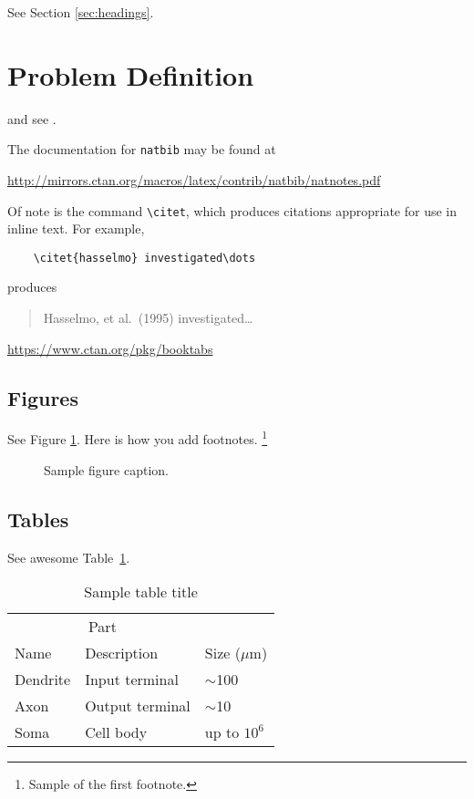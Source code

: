 \documentclass{article}
\begin{document}
	See Section \ref{sec:headings}.
	
	
	\section{Problem Definition}
	\label{sec:others}
	\lipsum[8] \cite{kour2014real,kour2014fast} and see \cite{hadash2018estimate}.
	
	The documentation for \verb+natbib+ may be found at
	\begin{center}
		\url{http://mirrors.ctan.org/macros/latex/contrib/natbib/natnotes.pdf}
	\end{center}
	Of note is the command \verb+\citet+, which produces citations
	appropriate for use in inline text.  For example,
	\begin{verbatim}
	\citet{hasselmo} investigated\dots
	\end{verbatim}
	produces
	\begin{quote}
		Hasselmo, et al.\ (1995) investigated\dots
	\end{quote}
	
	\begin{center}
		\url{https://www.ctan.org/pkg/booktabs}
	\end{center}
	
	
	\subsection{Figures}
	\lipsum[10] 
	See Figure \ref{fig:fig1}. Here is how you add footnotes. \footnote{Sample of the first footnote.}
	\lipsum[11] 
	
	\begin{figure}
		\centering
		\fbox{\rule[-.5cm]{4cm}{4cm} \rule[-.5cm]{4cm}{0cm}}
		\caption{Sample figure caption.}
		\label{fig:fig1}
	\end{figure}
	
	\subsection{Tables}
	\lipsum[12]
	See awesome Table~\ref{tab:table}.
	
	\begin{table}
		\caption{Sample table title}
		\centering
		\begin{tabular}{lll}
			\toprule
			\multicolumn{2}{c}{Part}                   \\
			\cmidrule(r){1-2}
			Name     & Description     & Size ($\mu$m) \\
			\midrule
			Dendrite & Input terminal  & $\sim$100     \\
			Axon     & Output terminal & $\sim$10      \\
			Soma     & Cell body       & up to $10^6$  \\
			\bottomrule
		\end{tabular}
		\label{tab:table}
	\end{table}
	
\end{document}
